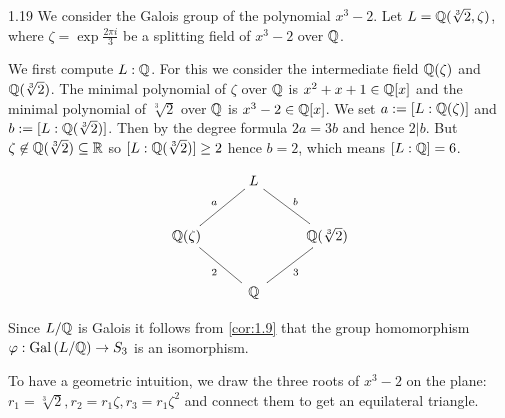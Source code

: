 \documentclass[twoside = false,	%
		headsepline,		%
		parskip = true,
		]{scrbook}						%
\begin{document}
        \begin{example}{}{1.19}
            We consider the Galois group of the polynomial $x^3-2$. Let $L = \mathbb Q(\sqrt[3]{2},\zeta)$, where $\zeta = \exp{\frac{2 \pi i}{3}}$ be a splitting field of $x^3 - 2$ over $\mathbb Q$.
            
            We first compute $L:\mathbb Q$. For this we consider the intermediate field $\mathbb Q(\zeta)$ and $\mathbb Q(\sqrt[3]{2})$. The minimal polynomial of $\zeta$ over $\mathbb Q$ is $x^2 + x + 1 \in \mathbb Q[x]$ and the minimal polynomial of $\sqrt[3]{2}$ over $\mathbb Q$ is $x^3 - 2 \in \mathbb Q[x]$. We set $a:= [L:\mathbb Q(\zeta)]$ and $b:=[L:\mathbb Q(\sqrt[3]{2})]$. Then by the degree formula $2a = 3b$ and hence $2 | b$. But $\zeta \not \in \mathbb Q(\sqrt[3]{2}) \subseteq \mathbb R$ so $[L:\mathbb Q(\sqrt[3]{2})] \geq 2$ hence $b = 2$, which means $[L:\mathbb Q] = 6$.
            
            \begin{equation*}
                \xymatrix@W=15pt
                {
                & L\ar@{-}_{a}[dl]\ar@{-}^{b}[dr] & \\
                \Q(\zeta)\ar@{-}_{2}[dr] & & \Q(\sqrt[3]{2})\ar@{-}^{3}[dl] \\
                & \Q &
                }
            \end{equation*}
        
            Since $L/\mathbb Q$ is Galois it follows from \ref{cor:1.9} that the group homomorphism $\varphi: \mathrm{Gal}\left( L/\mathbb Q\right) \rightarrow S_3$ is an isomorphism.
            
            To have a geometric intuition, we draw the three roots of $x^3 - 2$ on the plane: $r_1 = \sqrt[3]{2}, r_2 = r_1 \zeta, r_3 = r_1 \zeta^2$ and connect them to get an equilateral triangle.
            
            \begin{center}
\end{center}
\end{example}
\end{document}
